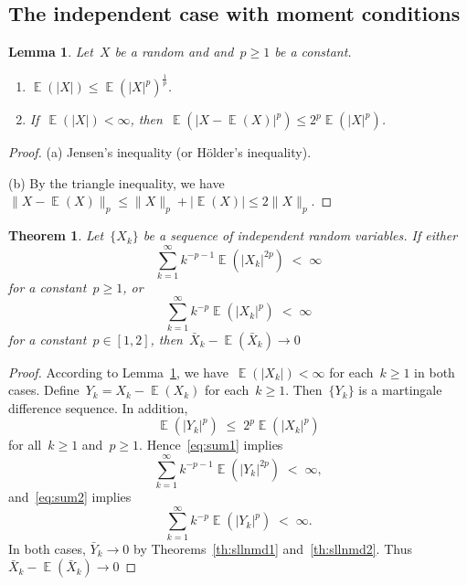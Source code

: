 \documentclass[12pt,a4paper]{article}  %
\newtheorem{theorem}{Theorem}[section]
\newtheorem{lemma}{Lemma}[section]
\theoremstyle{definition}
\numberwithin{equation}{section}
\newcommand{\as}{{\text{a.s.}}\xspace}
\DeclareMathOperator{\expc}{\mathbb{E}}
\begin{document}
\subsection{The independent case with moment conditions}
\label{sec:sllnindep}

\begin{lemma}
    \label{lem:expc}
    Let~$X$ be a random and and~$p \ge 1$ be a constant.
    \begin{enumerate}
        \item $\expc(|X|) \le \expc(|X|^p)^{\frac{1}{p}}$.
        \item If~$\expc(|X|) < \infty$, then~$\expc(|X - \expc(X)|^p)\le 2^p \expc(|X|^p)$.
    \end{enumerate}
\end{lemma}

\begin{proof}
    (a) Jensen's inequality (or H\"older's inequality).

    (b) By the triangle inequality, we have~$\|X - \expc(X)\|_p \le \|X\|_p + |\expc(X)| \le 2\|X\|_p$.
\end{proof}

\begin{theorem}
    \label{th:sllnindep}
    Let~$\{X_k\}$ be a sequence of independent random variables. If
    either
   \begin{equation}
    \label{eq:sum1}
    \sum_{k=1}^\infty k^{-p-1}\expc(|X_k|^{2p}) \;<\; \infty
   \end{equation}
   for a constant~$p\ge 1$, or
   \begin{equation}
    \label{eq:sum2}
    \sum_{k=1}^\infty k^{-p}\expc(|X_k|^{p}) \;<\; \infty
   \end{equation}
   for a constant~$p\in[1, 2]$, then~$\bar{X}_k - \expc(\bar{X}_k)\to 0$ \as
\end{theorem}

\begin{proof}
    According to Lemma~\ref{lem:expc}, we have~$\expc(|X_k|) < \infty$ for each~$k\ge 1$ in both cases.
    Define~$Y_k = X_k - \expc(X_k)$ for each~$k\ge 1$. Then~$\{Y_k\}$ is a martingale difference
    sequence. In addition,
    \[
        \expc(|Y_k|^{p}) \;\le\; 2^{p} \expc(|X_k|^p)
    \]
    for all~$k\ge 1$ and~$p\ge 1$. Hence~\eqref{eq:sum1} implies
   \begin{equation}
    \label{eq:sum1}
    \sum_{k=1}^\infty k^{-p-1}\expc(|Y_k|^{2p}) \;<\; \infty,
   \end{equation}
    and~\eqref{eq:sum2} implies
   \begin{equation}
    \label{eq:sum2}
    \sum_{k=1}^\infty k^{-p}\expc(|Y_k|^{p}) \;<\; \infty.
   \end{equation}
   In both cases, $\bar{Y}_k \to 0$ \as by Theorems~\ref{th:sllnmd1} and~\ref{th:sllnmd2}.
   Thus~$\bar{X}_k - \expc(\bar{X}_k) \to 0$ \as
\end{proof}
\end{document}

